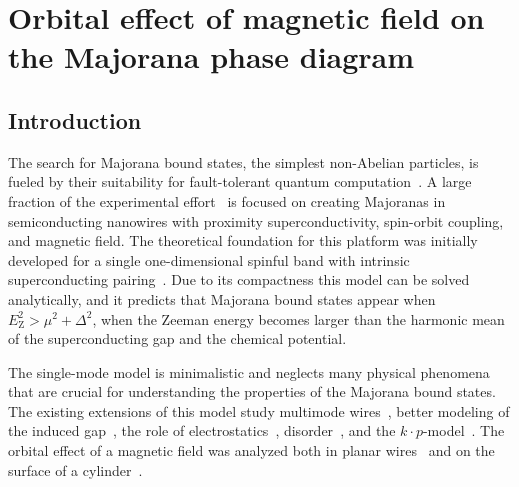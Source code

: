 \chapter{Orbital effect of magnetic field on the Majorana phase diagram}
\label{ch:orbitalfield}

\newpage
\noindent

\section{Introduction}
The search for Majorana bound states, the simplest non-Abelian particles, is fueled by their suitability for fault-tolerant quantum computation~\cite{Alicea2012,Beenakker2013}.
A large fraction of the experimental effort~\cite{Mourik2012,Das2012,Deng2012,Churchill2013,Deng2014} is focused on creating Majoranas in semiconducting nanowires with proximity superconductivity, spin-orbit coupling, and magnetic field.
The theoretical foundation for this platform was initially developed for a single one-dimensional spinful band with intrinsic superconducting pairing~\cite{Lutchyn2010,Oreg2010}.
Due to its compactness this model can be solved analytically, and it predicts that Majorana bound states appear when $E_\textrm{Z}^{2}>\mu^{2}+\Delta^{2}$, when the Zeeman energy becomes larger than the harmonic mean of the superconducting gap and the chemical potential.

The single-mode model is minimalistic and neglects many physical phenomena that are crucial for understanding the properties of the Majorana bound states.
The existing extensions of this model study multimode wires~\cite{Potter2010}, better modeling of the induced gap~\cite{Liu2012,Stanescu2014}, the role of electrostatics~\cite{Vuik2016}, disorder~\cite{Potter2012,Pientka2012,Adagideli2014}, and the $k \cdot p$-model~\cite{Stanescu2013a}.
The orbital effect of a magnetic field was analyzed both in planar wires~\cite{Osca2015, Lim2012} and on the surface of a cylinder~\cite{Lim2013}.

